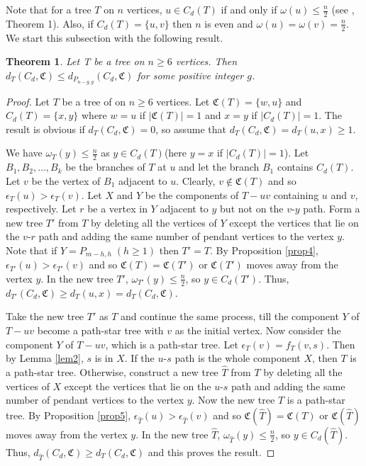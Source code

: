 \documentclass[10pt,a4paper]{amsart}
\newtheorem{theorem}{Theorem}[section]
\begin{document}
Note that for a tree $T$ on $n$ vertices, $u\in C_d(T)$ if and only if $\omega(u)\leq \frac{n}{2}$ (see \cite{Ka}, Theorem 1). Also, if $C_d(T)=\{u,v\}$ then $n$ is even and $\omega(u)=\omega(v)=\frac{n}{2}$. We start this subsection with the following result.
\begin{theorem}\label{thm:cd1}
Let T be a tree on $n\geq 6$ vertices. Then  $d_T(C_d,\mathfrak{C})\leq d_{P_{n-g,g}}(C_d,\mathfrak{C})$ for some positive integer $g$.
\end{theorem}
\begin{proof}
Let $T$ be a tree of on $n\geq 6$ vertices. Let $\mathfrak{C}(T)=\{w,u\}$ and $C_d(T)=\{x,y\}$ where $w=u$ if $|\mathfrak{C}(T)|=1$ and $x=y$ if $|C_d(T)|=1$.  The result is obvious if $d_T(C_d,\mathfrak{C})=0$, so assume that  $d_T(C_d,\mathfrak{C})=d_T(u,x)\geq 1$.

We have $\omega_T(y)\leq \frac{n}{2}$ as $y\in C_d(T)$(here $y=x$ if $|C_d(T)|=1$). Let $B_1,B_2,\ldots,B_k$ be the branches of $T$ at $u$ and let the branch $B_1$ contains $C_d(T)$. Let $v$ be the vertex of $B_1$ adjacent to $u$. Clearly, $v\notin \mathfrak{C}(T)$ and so $\epsilon_T(u)>\epsilon_T(v)$. Let $X$ and $Y$ be the components of $T-uv$ containing $u$ and $v$, respectively. Let $r$ be a vertex in $Y$ adjacent to $y$ but not on the $v$-$y$ path. Form  a new tree $T'$ from $T$ by deleting all the vertices of $Y$ except the vertices that lie on the $v$-$r$ path and adding the same number of pendant vertices to the vertex $y$. Note that if $Y=P_{m-h,h}\;(h\geq 1)$ then $T'=T.$ By Proposition \ref{prop4}, $\epsilon_{T'}(u)>\epsilon_{T'}(v)$ and so $\mathfrak{C}(T)=\mathfrak{C}(T')$ or $\mathfrak{C}(T')$ moves away from the vertex $y$. In the new tree $T'$, $\omega_{T'}(y)\leq \frac{n}{2}$, so $y\in C_d(T')$. Thus,  $d_{T'}(C_d,\mathfrak{C})\geq d_T(u,x)=d_T(C_d,\mathfrak{C})$.

Take the new tree $T'$ as $T$ and continue the same process, till the component $Y$ of $T-uv$ become a path-star tree with $v$ as the initial vertex. Now consider the component $Y$ of $T-uv$, which is a path-star tree. Let  $\epsilon_{T}(v)=f_T(v,s)$. Then by Lemma \ref{lem2}, $s$ is in $X$. If  the $u$-$s$ path is the whole component $X$, then $T$ is a path-star tree. Otherwise, construct a new tree $\hat{T}$ from $T$ by deleting all the vertices of $X$ except the vertices that lie on the $u$-$s$ path and adding the same number of pendant vertices to the vertex $y$. Now the new tree $\hat{T}$ is a path-star tree. By Proposition \ref{prop5}, $\epsilon_{\hat{T}}(u)>\epsilon_{\hat{T}}(v)$ and so $\mathfrak{C}(\hat{T})=\mathfrak{C}(T)$ or $\mathfrak{C}(\hat{T})$ moves away from the vertex $y$. In the new tree $\hat{T}$, $\omega_{\hat{T}}(y)\leq \frac{n}{2}$, so $y\in C_d(\hat{T})$. Thus, $d_{\hat{T}}(C_d,\mathfrak{C})\geq d_T(C_d,\mathfrak{C})$ and this proves the result.
\end{proof}
\end{document}
